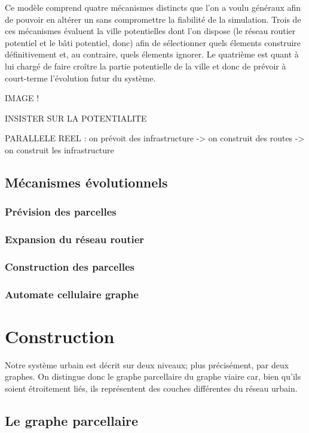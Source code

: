 \documentclass[10pt]{article}
\begin{document}
Ce modèle comprend quatre mécanismes distincts que l'on a voulu
généraux afin de pouvoir en altérer un sans compromettre la fiabilité
de la simulation. Trois de ces mécanismes évaluent la ville
potentielles dont l'on dispose (le réseau routier potentiel et le bâti
potentiel, donc) afin de sélectionner quels élements construire
définitivement et, au contraire, quels élements ignorer. Le quatrième
est quant à lui chargé de faire croître la partie potentielle de la
ville et donc de prévoir à court-terme l'évolution futur du système.

IMAGE !

INSISTER SUR LA POTENTIALITE

PARALLELE REEL : on prévoit des infrastructure -> on construit des
routes -> on construit les infrastructure

\subsection{Mécanismes évolutionnels}

\subsubsection{Prévision des parcelles}

\subsubsection{Expansion du réseau routier}

\subsubsection{Construction des parcelles}

\subsubsection{Automate cellulaire graphe}

\section{Construction}

Notre système urbain est décrit sur deux niveaux; plus précisément,
par deux graphes. On distingue donc le graphe parcellaire du graphe
viaire car, bien qu'ils soient étroitement liés, ils représentent des
couches différentes du réseau urbain.

\subsection{Le graphe parcellaire}
\end{document}
